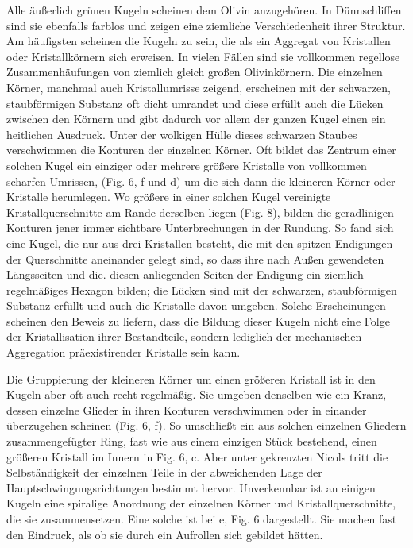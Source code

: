 \documentclass[a4paper, 11pt, oneside]{article}
\begin{document}
Alle äußerlich grünen Kugeln scheinen dem Olivin anzugehören. In Dünnschliffen sind sie ebenfalls farblos und zeigen eine ziemliche Verschiedenheit ihrer Struktur. Am häufigsten scheinen die Kugeln zu sein, die als ein Aggregat von Kristallen oder Kristallkörnern sich erweisen. In vielen Fällen sind sie vollkommen regellose Zusammenhäufungen von ziemlich gleich großen Olivinkörnern. Die einzelnen Körner, manchmal auch Kristallumrisse zeigend, erscheinen mit der schwarzen, staubförmigen Substanz oft dicht umrandet und diese erfüllt auch die Lücken zwischen den Körnern und gibt dadurch vor allem der ganzen Kugel einen ein heitlichen Ausdruck. Unter der wolkigen Hülle dieses schwarzen Staubes verschwimmen die Konturen der einzelnen Körner. Oft bildet das Zentrum einer solchen Kugel ein einziger oder mehrere größere Kristalle von vollkommen scharfen Umrissen, (Fig. 6, f und d) um die sich dann die kleineren Körner oder Kristalle herumlegen. Wo größere in einer solchen Kugel vereinigte Kristallquerschnitte am Rande derselben liegen (Fig. 8), bilden die geradlinigen Konturen jener immer sichtbare Unterbrechungen in der Rundung. So fand sich eine Kugel, die nur aus drei Kristallen besteht, die mit den spitzen Endigungen der Querschnitte aneinander gelegt sind, so dass ihre nach Außen gewendeten Längsseiten und die. diesen anliegenden Seiten der Endigung ein ziemlich regelmäßiges Hexagon bilden; die Lücken sind mit der schwarzen, staubförmigen Substanz erfüllt und auch die Kristalle davon umgeben. Solche Erscheinungen scheinen den Beweis zu liefern, dass die Bildung dieser Kugeln nicht eine Folge der Kristallisation ihrer Bestandteile, sondern lediglich der mechanischen Aggregation präexistirender Kristalle sein kann.

Die Gruppierung der kleineren Körner um einen größeren Kristall ist in den Kugeln aber oft auch recht regelmäßig. Sie umgeben denselben wie ein Kranz, dessen einzelne Glieder in ihren Konturen verschwimmen oder in einander überzugehen scheinen (Fig. 6, f). So umschließt ein aus solchen einzelnen Gliedern zusammengefügter Ring, fast wie aus einem einzigen Stück bestehend, einen größeren Kristall im Innern in Fig. 6, c. Aber unter gekreuzten Nicols tritt die Selbständigkeit der einzelnen Teile in der abweichenden Lage der Hauptschwingungsrichtungen bestimmt hervor. Unverkennbar ist an einigen Kugeln eine spiralige Anordnung der einzelnen Körner und Kristallquerschnitte, die sie zusammensetzen. Eine solche ist bei e, Fig. 6 dargestellt. Sie machen fast den Eindruck, als ob sie durch ein Aufrollen sich gebildet hätten.
\end{document}
